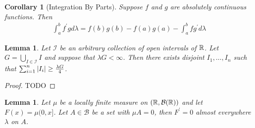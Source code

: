 \documentclass{amsart}
\newtheorem{cor}[thm]{Corollary}
\newtheorem{lem}[thm]{Lemma}
\theoremstyle{remark}
\theoremstyle{definition}
\begin{document}
\begin{cor}[Integration By Parts]\label{IntegrationByParts}Suppose $f$
  and $g$ are absolutely continuous functions.  Then 
\begin{align*}
\int_a^b f^\prime g d\lambda
  = f(b)g(b) - f(a)g(a) - \int_a^b f g^\prime d \lambda
\end{align*}
\end{cor}
\begin{lem}\label{IntervalSelection}Let $\mathcal{I}$ be an arbitrary
  collection of open intervals of $\mathbb{R}$.  Let $G = \bigcup_{I \in
    \mathcal{I}} I$ and suppose that $\lambda G < \infty$.  Then there
  exists disjoint $I_1, \dots, I_n$ such that $\sum_{i=1}^n \left \vert I_i \right \vert
  \geq \frac{\lambda G}{4}$.
\end{lem}
\begin{proof}TODO
\end{proof}
\begin{lem}\label{DifferentiationOnNullSets}Let $\mu$ be a locally finite measure on $(\mathbb{R}, \mathcal{B}(\mathbb{R}))$
  and let $F(x) = \mu (0,x]$.  Let $A \in \mathcal{B}$ be a set with
  $\mu A = 0$, then $F^\prime = 0$ almost everywhere $\lambda$ on $A$.
\end{lem}
\end{document}
